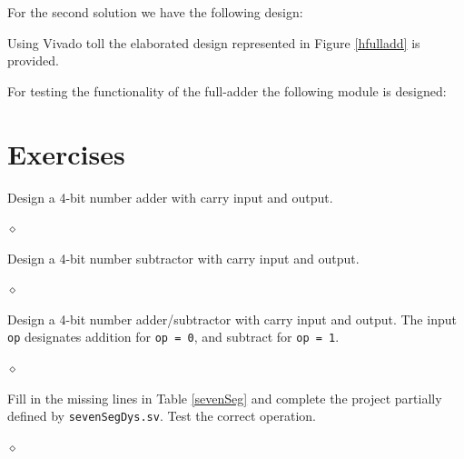 
For the second solution we have the following design:


Using Vivado toll the elaborated design represented in Figure \ref{hfulladd} is provided.


For testing the functionality of the full-adder the following module is designed:



\section{Exercises}

\begin{problem}
Design a 4-bit number adder with carry input and output.

$\diamond$
\end{problem}

\begin{problem}
Design a 4-bit number subtractor  with carry input and output.

$\diamond$
\end{problem}

\begin{problem}
Design a 4-bit number adder/subtractor with carry input and output. The input {\tt op} designates addition for {\tt op = 0}, and subtract for {\tt op = 1}.

$\diamond$
\end{problem}

\begin{problem}
Fill in the missing lines in Table \ref{sevenSeg} and complete the project partially defined by {\tt sevenSegDys.sv}. Test the correct operation.

$\diamond$
\end{problem}

